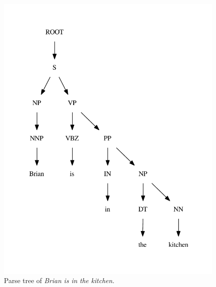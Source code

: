 \begin{figure}
  \centering
    \includegraphics[scale=0.6]{../examples_NLP_grammatical/parsetree.pdf}
  \caption{Parse tree of \emph{Brian is in the kitchen.}}
  \label{ptree}
\end{figure}

